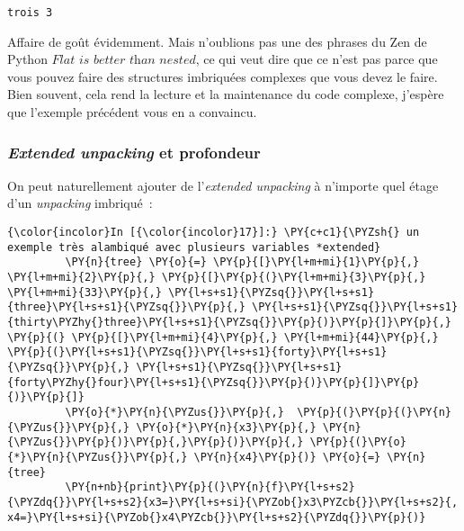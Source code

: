     \begin{Verbatim}[commandchars=\\\{\}]
trois 3

    \end{Verbatim}

    Affaire de goût évidemment. Mais n'oublions pas une des phrases du Zen
de Python \(\textit{Flat is better than nested}\), ce qui veut dire que
ce n'est pas parce que vous pouvez faire des structures imbriquées
complexes que vous devez le faire. Bien souvent, cela rend la lecture et
la maintenance du code complexe, j'espère que l'exemple précédent vous
en a convaincu.

    \hypertarget{extended-unpacking-et-profondeur}{%
\subsubsection{\texorpdfstring{\emph{Extended unpacking} et
profondeur}{Extended unpacking et profondeur}}\label{extended-unpacking-et-profondeur}}

    On peut naturellement ajouter de l'\emph{extended unpacking} à n'importe
quel étage d'un \emph{unpacking} imbriqué~:

    \begin{Verbatim}[commandchars=\\\{\}]
{\color{incolor}In [{\color{incolor}17}]:} \PY{c+c1}{\PYZsh{} un exemple très alambiqué avec plusieurs variables *extended}
         \PY{n}{tree} \PY{o}{=} \PY{p}{[}\PY{l+m+mi}{1}\PY{p}{,} \PY{l+m+mi}{2}\PY{p}{,} \PY{p}{[}\PY{p}{(}\PY{l+m+mi}{3}\PY{p}{,} \PY{l+m+mi}{33}\PY{p}{,} \PY{l+s+s1}{\PYZsq{}}\PY{l+s+s1}{three}\PY{l+s+s1}{\PYZsq{}}\PY{p}{,} \PY{l+s+s1}{\PYZsq{}}\PY{l+s+s1}{thirty\PYZhy{}three}\PY{l+s+s1}{\PYZsq{}}\PY{p}{)}\PY{p}{]}\PY{p}{,} \PY{p}{(} \PY{p}{[}\PY{l+m+mi}{4}\PY{p}{,} \PY{l+m+mi}{44}\PY{p}{,} \PY{p}{(}\PY{l+s+s1}{\PYZsq{}}\PY{l+s+s1}{forty}\PY{l+s+s1}{\PYZsq{}}\PY{p}{,} \PY{l+s+s1}{\PYZsq{}}\PY{l+s+s1}{forty\PYZhy{}four}\PY{l+s+s1}{\PYZsq{}}\PY{p}{)}\PY{p}{]}\PY{p}{)}\PY{p}{]}
         \PY{o}{*}\PY{n}{\PYZus{}}\PY{p}{,}  \PY{p}{(}\PY{p}{(}\PY{n}{\PYZus{}}\PY{p}{,} \PY{o}{*}\PY{n}{x3}\PY{p}{,} \PY{n}{\PYZus{}}\PY{p}{)}\PY{p}{,}\PY{p}{)}\PY{p}{,} \PY{p}{(}\PY{o}{*}\PY{n}{\PYZus{}}\PY{p}{,} \PY{n}{x4}\PY{p}{)} \PY{o}{=} \PY{n}{tree}
         \PY{n+nb}{print}\PY{p}{(}\PY{n}{f}\PY{l+s+s2}{\PYZdq{}}\PY{l+s+s2}{x3=}\PY{l+s+si}{\PYZob{}x3\PYZcb{}}\PY{l+s+s2}{, x4=}\PY{l+s+si}{\PYZob{}x4\PYZcb{}}\PY{l+s+s2}{\PYZdq{}}\PY{p}{)}
\end{Verbatim}


